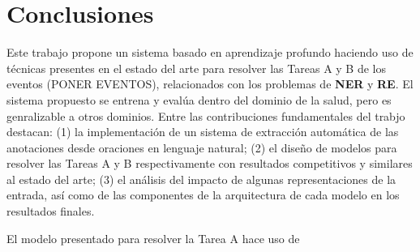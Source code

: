\chapter*{Conclusiones}\label{chapter:conclusions}

Este trabajo propone un sistema basado en aprendizaje profundo haciendo uso de t\'ecnicas presentes en el estado del arte para resolver las Tareas A y B de los eventos (PONER EVENTOS), relacionados con los problemas de \textbf{NER} y \textbf{RE}. El sistema propuesto se entrena y eval\'ua dentro del dominio de la salud, pero es genralizable a otros dominios. Entre las contribuciones fundamentales del trabjo destacan: (1) la implementaci\'on de un sistema de extracci\'on autom\'atica de las anotaciones desde oraciones en lenguaje natural; (2) el dise\~no de modelos para resolver las Tareas A y B respectivamente con resultados competitivos y similares al estado del arte; (3) el an\'alisis del impacto de algunas representaciones de la entrada, as\'i como de las componentes de la arquitectura de cada modelo en los resultados finales. 

El modelo presentado para resolver la Tarea A hace uso de 
